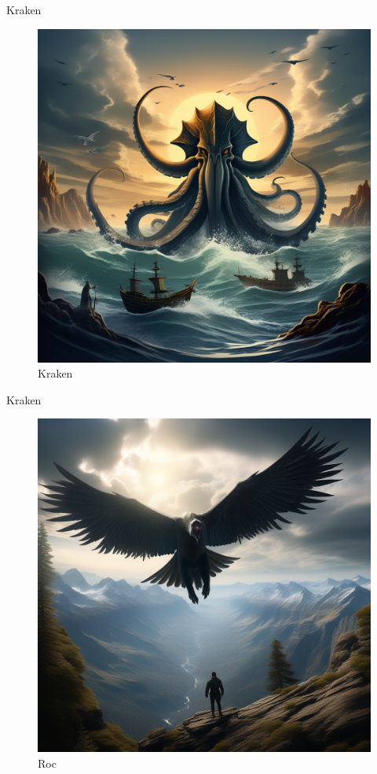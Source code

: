 Kraken

\begin{figure}
\centering
\includegraphics{create-an-image-of-a-kraken-roaming-the-sea-with-the-stylised-style-of-medieval-bestiaries--2 1.png}
\caption{Kraken}
\end{figure}

Kraken

\begin{figure}
\centering
\includegraphics{a-giant-roc-flying-over-the-rocky-mountains-his-shadow-covers-most-of-the-landscape-sf-intricate-.png}
\caption{Roc}
\end{figure}

